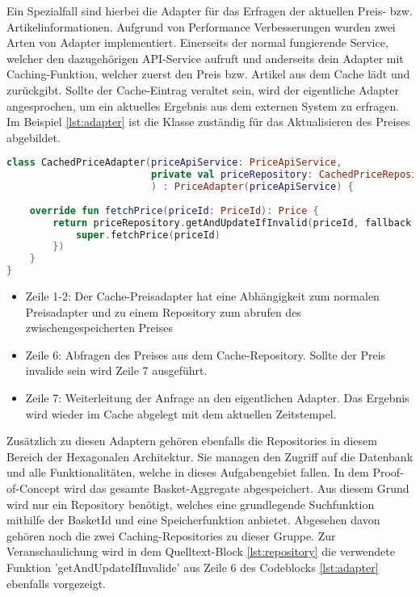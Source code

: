 Ein Spezialfall sind hierbei die Adapter für das Erfragen der aktuellen Preis- bzw. Artikelinformationen. Aufgrund von Performance Verbesserungen wurden zwei Arten von Adapter implementiert. Einerseits der normal fungierende Service, welcher den dazugehörigen API-Service aufruft und anderseits dein Adapter mit Caching-Funktion, welcher zuerst den Preis bzw. Artikel aus dem Cache lädt und zurückgibt. Sollte der Cache-Eintrag veraltet sein, wird der eigentliche Adapter angesprochen, um ein aktuelles Ergebnis aus dem externen System zu erfragen. Im Beispiel \ref{lst:adapter} ist die Klasse zuständig für das Aktualisieren des Preises abgebildet.

\begin{minipage}{\linewidth} %
	\begin{lstlisting}[caption={Preisadapter mit Caching-Funktion}, label={lst:adapter}, language=Kotlin]
class CachedPriceAdapter(priceApiService: PriceApiService,
						 private val priceRepository: CachedPriceRepository
						 ) : PriceAdapter(priceApiService) {
	
	override fun fetchPrice(priceId: PriceId): Price {
		return priceRepository.getAndUpdateIfInvalid(priceId, fallback = {
			super.fetchPrice(priceId)
		})
	}
}
	\end{lstlisting}
\end{minipage}

\begin{itemize}[noitemsep,nolistsep]
	\item Zeile 1-2: Der Cache-Preisadapter hat eine Abhängigkeit zum normalen Preisadapter und zu einem Repository zum abrufen des zwischengespeicherten Preises
	\item Zeile 6: Abfragen des Preises aus dem Cache-Repository. Sollte der Preis invalide sein wird Zeile 7 ausgeführt.
	\item Zeile 7: Weiterleitung der Anfrage an den eigentlichen Adapter. Das Ergebnis wird wieder im Cache abgelegt mit dem aktuellen Zeitstempel.
\end{itemize}

Zusätzlich zu diesen Adaptern gehören ebenfalls die Repositories in diesem Bereich der Hexagonalen Architektur. Sie managen den Zugriff auf die Datenbank und alle Funktionalitäten, welche in dieses Aufgabengebiet fallen. In dem Proof-of-Concept wird das gesamte Basket-Aggregate abgespeichert. Aus diesem Grund wird nur ein Repository benötigt, welches eine grundlegende Suchfunktion mithilfe der BasketId und eine Speicherfunktion anbietet. Abgesehen davon gehören noch die zwei Caching-Repositories zu dieser Gruppe. Zur Veranschaulichung wird in dem Quelltext-Block \ref{lst:repository} die verwendete Funktion 'getAndUpdateIfInvalide' aus Zeile 6 des Codeblocks \ref{lst:adapter} ebenfalls vorgezeigt.

